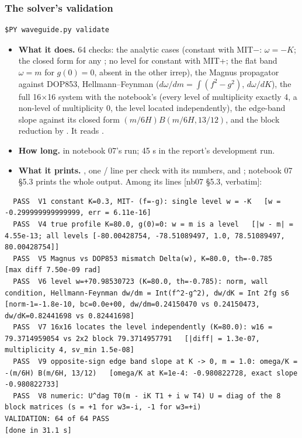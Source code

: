 \subsubsection{The solver's validation}
\label{sec:6.6.2}

\begin{Verbatim}
$PY waveguide.py validate
\end{Verbatim}

\begin{itemize}
  \item \textbf{What it does.} 64 checks: the analytic cases (constant  with MIT\ensuremath{-}: $\omega = -K$; the closed form for any ; no level for constant  with MIT+; the flat band $\omega = m$ for $g(0) = 0$, absent in the other irrep), the Magnus propagator against DOP853, Hellmann--Feynman ($d \omega/dm = \int (f^{2} - g^{2})$, $d \omega/dK$), the full 16$\times$16 system with the notebook's  (every level of multiplicity exactly 4, a non-level of multiplicity 0, the level located independently), the edge-band slope against its closed form $(m/6H) B(m/6H, 13/12)$, and the block reduction by . It reads .
  \item \textbf{How long.} \cftt{[done in 31.1 s]} in notebook 07's run; 45 s in the report's development run.
  \item \textbf{What it prints.} , one / line per check with its numbers,  and ; notebook 07 \S{}5.3 prints the whole output. Among its lines [nb07 \S{}5.3, verbatim]:
\end{itemize}

\begin{Verbatim}
  PASS  V1 constant K=0.3, MIT- (f=-g): single level w = -K   [w = -0.299999999999999, err = 6.11e-16]
  PASS  V4 true profile K=80.0, g(0)=0: w = m is a level   [|w - m| = 4.55e-13; all levels [-80.00428754, -78.51089497, 1.0, 78.51089497, 80.00428754]]
  PASS  V5 Magnus vs DOP853 mismatch Delta(w), K=80.0, th=-0.785   [max diff 7.50e-09 rad]
  PASS  V6 level w=+70.98530723 (K=80.0, th=-0.785): norm, wall condition, Hellmann-Feynman dw/dm = Int(f^2-g^2), dw/dK = Int 2fg s6   [norm-1=-1.8e-10, bc=0.0e+00, dw/dm=0.24150470 vs 0.24150473, dw/dK=0.82441698 vs 0.82441698]
  PASS  V7 16x16 locates the level independently (K=80.0): w16 = 79.3714959054 vs 2x2 block 79.3714957791   [|diff| = 1.3e-07, multiplicity 4, sv_min 1.5e-08]
  PASS  V9 opposite-sign edge band slope at K -> 0, m = 1.0: omega/K = -(m/6H) B(m/6H, 13/12)   [omega/K at K=1e-4: -0.980822728, exact slope -0.980822733]
  PASS  V8 numeric: U^dag T0(m - iK T1 + i w T4) U = diag of the 8 block matrices (s = +1 for w3=-i, -1 for w3=+i)
VALIDATION: 64 of 64 PASS
[done in 31.1 s]
\end{Verbatim}


